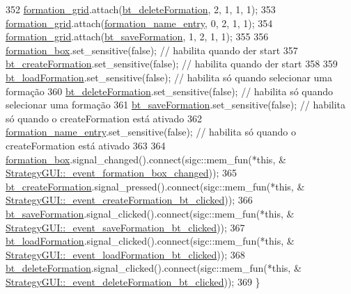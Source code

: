 \begin{DoxyCode}
352     \hyperlink{class_strategy_g_u_i_a86e01136167ad809807e6341957a850c}{formation\_grid}.attach(\hyperlink{class_strategy_g_u_i_acce16be9100c9d09a3a9ca2087b8370b}{bt\_deleteFormation}, 2, 1, 1, 1);
353     \hyperlink{class_strategy_g_u_i_a86e01136167ad809807e6341957a850c}{formation\_grid}.attach(\hyperlink{class_strategy_g_u_i_a19406b76eaf73c06545aa1c67c0636ce}{formation\_name\_entry}, 0, 2, 1, 1);
354     \hyperlink{class_strategy_g_u_i_a86e01136167ad809807e6341957a850c}{formation\_grid}.attach(\hyperlink{class_strategy_g_u_i_ae68d7475f55a82e46d74eb8b3cd53b9e}{bt\_saveFormation}, 1, 2, 1, 1);
355 
356     \hyperlink{class_strategy_g_u_i_a0f2ab3a2cdca1663def9c4ec1e366a5d}{formation\_box}.set\_sensitive(\textcolor{keyword}{false}); \textcolor{comment}{// habilita quando der start}
357     \hyperlink{class_strategy_g_u_i_ab6edc11fb98709c98ad1815998aa937a}{bt\_createFormation}.set\_sensitive(\textcolor{keyword}{false}); \textcolor{comment}{// habilita quando der start}
358 
359     \hyperlink{class_strategy_g_u_i_a89efee7959e39e3c993080d88262521d}{bt\_loadFormation}.set\_sensitive(\textcolor{keyword}{false}); \textcolor{comment}{// habilita só quando selecionar uma formação}
360     \hyperlink{class_strategy_g_u_i_acce16be9100c9d09a3a9ca2087b8370b}{bt\_deleteFormation}.set\_sensitive(\textcolor{keyword}{false}); \textcolor{comment}{// habilita só quando selecionar uma
       formação}
361     \hyperlink{class_strategy_g_u_i_ae68d7475f55a82e46d74eb8b3cd53b9e}{bt\_saveFormation}.set\_sensitive(\textcolor{keyword}{false}); \textcolor{comment}{// habilita só quando o createFormation está
       ativado}
362     \hyperlink{class_strategy_g_u_i_a19406b76eaf73c06545aa1c67c0636ce}{formation\_name\_entry}.set\_sensitive(\textcolor{keyword}{false}); \textcolor{comment}{// habilita só quando o createFormation
       está ativado}
363 
364     \hyperlink{class_strategy_g_u_i_a0f2ab3a2cdca1663def9c4ec1e366a5d}{formation\_box}.signal\_changed().connect(sigc::mem\_fun(*\textcolor{keyword}{this}, &
      \hyperlink{class_strategy_g_u_i_a3b4da86e02b0e51013801fed1ab9807f}{StrategyGUI::\_event\_formation\_box\_changed}));
365     \hyperlink{class_strategy_g_u_i_ab6edc11fb98709c98ad1815998aa937a}{bt\_createFormation}.signal\_pressed().connect(sigc::mem\_fun(*\textcolor{keyword}{this}, &
      \hyperlink{class_strategy_g_u_i_ada313ae77f231e7007ac83753cbdb5dc}{StrategyGUI::\_event\_createFormation\_bt\_clicked}));
366     \hyperlink{class_strategy_g_u_i_ae68d7475f55a82e46d74eb8b3cd53b9e}{bt\_saveFormation}.signal\_clicked().connect(sigc::mem\_fun(*\textcolor{keyword}{this}, &
      \hyperlink{class_strategy_g_u_i_a21327fb17108edba191fa216ec73aafd}{StrategyGUI::\_event\_saveFormation\_bt\_clicked}));
367     \hyperlink{class_strategy_g_u_i_a89efee7959e39e3c993080d88262521d}{bt\_loadFormation}.signal\_clicked().connect(sigc::mem\_fun(*\textcolor{keyword}{this}, &
      \hyperlink{class_strategy_g_u_i_ac0caff70885aad2da169d808d97be3d2}{StrategyGUI::\_event\_loadFormation\_bt\_clicked}));
368     \hyperlink{class_strategy_g_u_i_acce16be9100c9d09a3a9ca2087b8370b}{bt\_deleteFormation}.signal\_clicked().connect(sigc::mem\_fun(*\textcolor{keyword}{this}, &
      \hyperlink{class_strategy_g_u_i_a5301539a6dc0b88cf402bf62d372c8fb}{StrategyGUI::\_event\_deleteFormation\_bt\_clicked}));
369 \}
\end{DoxyCode}
